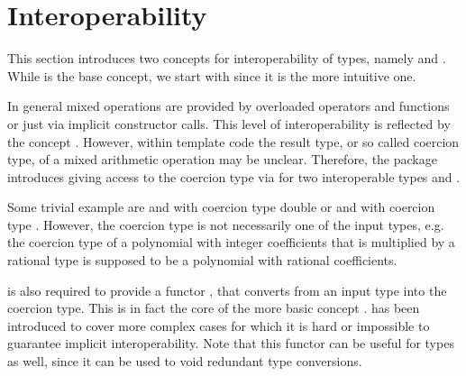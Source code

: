 \section{Interoperability}

This section introduces two concepts for interoperability of types, 
namely  and . While 
 is the base concept, we start with 
 since it is the more intuitive one.

In general mixed operations are provided by overloaded operators and
functions or just via implicit constructor calls. 
This level of interoperability is reflected by the concept 
. However, within template code the result type, 
or so called coercion type, of a mixed arithmetic operation may be unclear.
Therefore, the package introduces 
giving access to the coercion type via 
for two interoperable types  and . 


Some trivial example are  and  with coercion type double 
or  and  with coercion type .
However, the coercion type is not necessarily one of the input types,
e.g. the coercion type of a polynomial 
with integer coefficients that is multiplied by a rational type 
is supposed to be a polynomial with rational coefficients.

 is also
required to provide a functor , that 
converts from an input type into the coercion type. This is in fact the core
of the more basic concept . 
 has been introduced to cover more complex cases 
for which it is hard or impossible to guarantee implicit interoperability.  
Note that this functor can be useful for  types 
as well, since it can be used to void redundant type conversions.  

